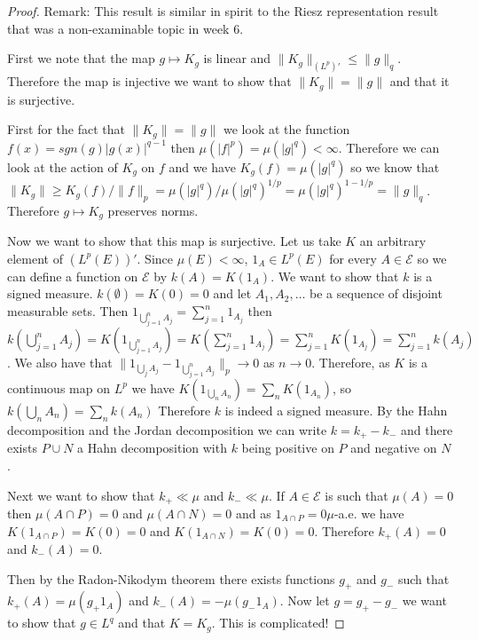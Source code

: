 \documentclass[
]{book}
\theoremstyle{definition}
\theoremstyle{definition}
\theoremstyle{definition}
\theoremstyle{definition}
\theoremstyle{remark}
\begin{document}
\begin{proof}
Remark: This result is similar in spirit to the Riesz representation result that was a non-examinable topic in week 6.

First we note that the map \(g \mapsto K_g\) is linear and \(\|K_g\|_{(L^p)'} \leq \|g\|_q\). Therefore the map is injective we want to show that \(\|K_g\| = \|g\|\) and that it is surjective.

First for the fact that \(\|K_g\| = \|g\|\) we look at the function \(f(x) = sgn(g)|g(x)|^{q-1}\) then \(\mu(|f|^p) = \mu(|g|^q) < \infty\). Therefore we can look at the action of \(K_g\) on \(f\) and we have \(K_g(f) = \mu(|g|^q)\) so we know that \(\|K_g\| \geq K_g(f)/\|f\|_p = \mu(|g|^q)/\mu(|g|^q)^{1/p} = \mu(|g|^q)^{1-1/p} = \|g\|_q\). Therefore \(g \mapsto K_g\) preserves norms.

Now we want to show that this map is surjective. Let us take \(K\) an arbitrary element of \((L^p(E))'\). Since \(\mu(E) < \infty\), \(1_A \in L^p(E)\) for every \(A \in \mathcal{E}\) so we can define a function on \(\mathcal{E}\) by \(k(A)=K(1_A)\). We want to show that \(k\) is a signed measure. \(k(\emptyset)=K(0)=0\) and let \(A_1,A_2,\dots\) be a sequence of disjoint measurable sets. Then \(1_{\bigcup_{j=1}^n A_j} = \sum_{j=1}^n 1_{A_j}\) then \(k(\bigcup_{j=1}^n A_j) = K(1_{\bigcup_{j=1}^n A_j}) = K( \sum_{j=1}^n 1_{A_j}) = \sum_{j=1}^n K(1_{A_j}) = \sum_{j=1}^n k(A_j)\). We also have that \(\| 1_{\bigcup_j A_j} - 1_{\bigcup_{j=1}^n A_j} \|_p \rightarrow 0\) as \(n \rightarrow 0\). Therefore, as \(K\) is a continuous map on \(L^p\) we have \(K(1_{\bigcup_n A_n}) = \sum_n K(1_{A_n})\), so \(k(\bigcup_n A_n) = \sum_n k(A_n)\) Therefore \(k\) is indeed a signed measure. By the Hahn decomposition and the Jordan decomposition we can write \(k = k_+ - k_-\) and there exists \(P \cup N\) a Hahn decomposition with \(k\) being positive on \(P\) and negative on \(N\).

Next we want to show that \(k_+ \ll \mu\) and \(k_- \ll \mu\). If \(A \in \mathcal{E}\) is such that \(\mu(A) = 0\) then \(\mu(A \cap P)=0\) and \(\mu(A \cap N) = 0\) and as \(1_{A \cap P}= 0 \mu\)-a.e. we have \(K(1_{A \cap P}) = K(0) = 0\) and \(K(1_{A \cap N}) = K(0) = 0\). Therefore \(k_+(A) = 0\) and \(k_-(A) = 0\).

Then by the Radon-Nikodym theorem there exists functions \(g_+\) and \(g_-\) such that \(k_+(A) = \mu(g_+1_A)\) and \(k_-(A) = - \mu(g_- 1_A)\). Now let \(g = g_+ - g_-\) we want to show that \(g \in L^q\) and that \(K = K_g\). This is complicated!


\end{proof}
\end{document}
